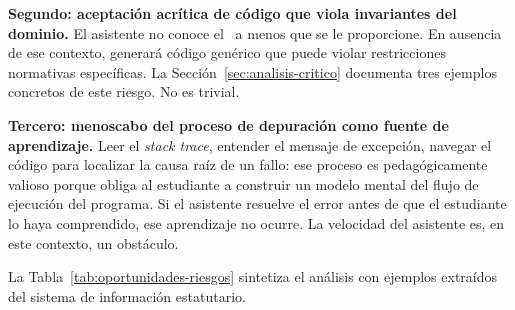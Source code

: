 \textbf{Segundo: aceptación acrítica de código que viola invariantes del dominio.}
El asistente no conoce el \acuerdo\ a menos que se le proporcione. En ausencia
de ese contexto, generará código genérico que puede violar restricciones normativas
específicas. La Sección~\ref{sec:analisis-critico} documenta tres ejemplos
concretos de este riesgo. No es trivial.

\textbf{Tercero: menoscabo del proceso de depuración como fuente de aprendizaje.}
Leer el \textit{stack trace}, entender el mensaje de excepción, navegar el código
para localizar la causa raíz de un fallo: ese proceso es pedagógicamente valioso
porque obliga al estudiante a construir un modelo mental del flujo de ejecución
del programa. Si el asistente resuelve el error antes de que el estudiante lo
haya comprendido, ese aprendizaje no ocurre. La velocidad del asistente es,
en este contexto, un obstáculo.

La Tabla~\ref{tab:oportunidades-riesgos} sintetiza el análisis con ejemplos
extraídos del sistema de información estatutario.

